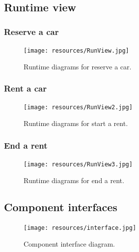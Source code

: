 \newpage
\subsection{Runtime view}

\subsubsection*{Reserve a car}
\begin{figure}[hp]
\centering
\texttt{[image: resources/RunView.jpg]}
\caption{\label{fig:reserve}Runtime diagrams for reserve a car.}
\end{figure}

\newpage
\subsubsection*{Rent a car}
\begin{figure}[hp]
\centering
\texttt{[image: resources/RunView2.jpg]}
\caption{\label{fig:startrent}Runtime diagrams for start a rent.}
\end{figure}

\newpage
\subsubsection*{End a rent}
\begin{figure}[hp]
\centering
\texttt{[image: resources/RunView3.jpg]}
\caption{\label{fig:endrent}Runtime diagrams for end a rent.}
\end{figure}


\newpage
\subsection{Component interfaces}
\begin{figure}[hp]
\centering
\texttt{[image: resources/interface.jpg]}
\caption{\label{fig:interface}Component interface diagram.}
\end{figure}


\newpage
